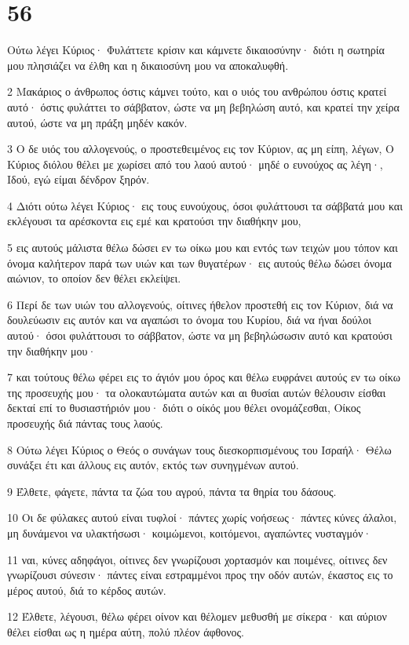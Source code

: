 \chapter{56}

\par Ούτω λέγει Κύριος· Φυλάττετε κρίσιν και κάμνετε δικαιοσύνην· διότι η σωτηρία μου πλησιάζει να έλθη και η δικαιοσύνη μου να αποκαλυφθή.
\par 2 Μακάριος ο άνθρωπος όστις κάμνει τούτο, και ο υιός του ανθρώπου όστις κρατεί αυτό· όστις φυλάττει το σάββατον, ώστε να μη βεβηλώση αυτό, και κρατεί την χείρα αυτού, ώστε να μη πράξη μηδέν κακόν.
\par 3 Ο δε υιός του αλλογενούς, ο προστεθειμένος εις τον Κύριον, ας μη είπη, λέγων, Ο Κύριος διόλου θέλει με χωρίσει από του λαού αυτού· μηδέ ο ευνούχος ας λέγη·, Ιδού, εγώ είμαι δένδρον ξηρόν.
\par 4 Διότι ούτω λέγει Κύριος· εις τους ευνούχους, όσοι φυλάττουσι τα σάββατά μου και εκλέγουσι τα αρέσκοντα εις εμέ και κρατούσι την διαθήκην μου,
\par 5 εις αυτούς μάλιστα θέλω δώσει εν τω οίκω μου και εντός των τειχών μου τόπον και όνομα καλήτερον παρά των υιών και των θυγατέρων· εις αυτούς θέλω δώσει όνομα αιώνιον, το οποίον δεν θέλει εκλείψει.
\par 6 Περί δε των υιών του αλλογενούς, οίτινες ήθελον προστεθή εις τον Κύριον, διά να δουλεύωσιν εις αυτόν και να αγαπώσι το όνομα του Κυρίου, διά να ήναι δούλοι αυτού· όσοι φυλάττουσι το σάββατον, ώστε να μη βεβηλώσωσιν αυτό και κρατούσι την διαθήκην μου·
\par 7 και τούτους θέλω φέρει εις το άγιόν μου όρος και θέλω ευφράνει αυτούς εν τω οίκω της προσευχής μου· τα ολοκαυτώματα αυτών και αι θυσίαι αυτών θέλουσιν είσθαι δεκταί επί το θυσιαστήριόν μου· διότι ο οίκός μου θέλει ονομάζεσθαι, Οίκος προσευχής διά πάντας τους λαούς.
\par 8 Ούτω λέγει Κύριος ο Θεός ο συνάγων τους διεσκορπισμένους του Ισραήλ· Θέλω συνάξει έτι και άλλους εις αυτόν, εκτός των συνηγμένων αυτού.
\par 9 Έλθετε, φάγετε, πάντα τα ζώα του αγρού, πάντα τα θηρία του δάσους.
\par 10 Οι δε φύλακες αυτού είναι τυφλοί· πάντες χωρίς νοήσεως· πάντες κύνες άλαλοι, μη δυνάμενοι να υλακτήσωσι· κοιμώμενοι, κοιτόμενοι, αγαπώντες νυσταγμόν·
\par 11 ναι, κύνες αδηφάγοι, οίτινες δεν γνωρίζουσι χορτασμόν και ποιμένες, οίτινες δεν γνωρίζουσι σύνεσιν· πάντες είναι εστραμμένοι προς την οδόν αυτών, έκαστος εις το μέρος αυτού, διά το κέρδος αυτών.
\par 12 Έλθετε, λέγουσι, θέλω φέρει οίνον και θέλομεν μεθυσθή με σίκερα· και αύριον θέλει είσθαι ως η ημέρα αύτη, πολύ πλέον άφθονος.

